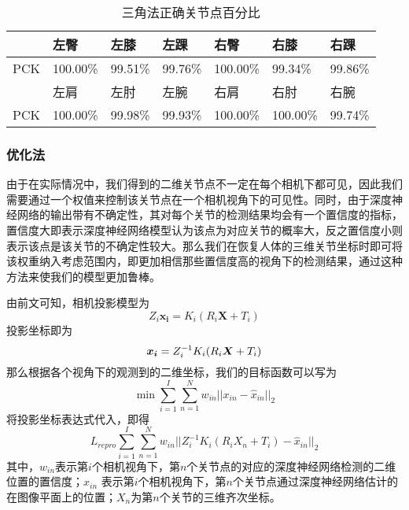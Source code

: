 \begin{table}[H]
    \centering
    \begin{tabular}{lllllll}
        \hline
            & 左臀     & 左膝    & 左踝    & 右臀     & 右膝     & 右踝    \\
        \hline
        PCK & 100.00\% & 99.51\% & 99.76\% & 100.00\% & 99.34\%  & 99.86\% \\
            & 左肩     & 左肘    & 左腕    & 右肩     & 右肘     & 右腕    \\
        PCK & 100.00\% & 99.98\% & 99.93\% & 100.00\% & 100.00\% & 99.74\% \\
        \hline
    \end{tabular}
    \caption{三角法正确关节点百分比\label{tab:3dpck}}
\end{table}


\subsubsection{优化法}
由于在实际情况中，我们得到的二维关节点不一定在每个相机下都可见，因此我们需要通过一个权值来控制该关节点在一个相机视角下的可见性。同时，由于深度神经网络的输出带有不确定性，其对每个关节的检测结果均会有一个置信度的指标，置信度大即表示深度神经网络模型认为该点为对应关节的概率大，反之置信度小则表示该点是该关节的不确定性较大。那么我们在恢复人体的三维关节坐标时即可将该权重纳入考虑范围内，即更加相信那些置信度高的视角下的检测结果，通过这种方法来使我们的模型更加鲁棒。

由前文可知，相机投影模型为
\begin{equation}
    Z_i \bm{x_i} = K_i(R_i\bm{X} + T_i)
\end{equation}
投影坐标即为
\begin{equation}
    \bm{x_i} = Z_i^{-1}K_i(R_i{\bm{X}} + T_i)
\end{equation}
那么根据各个视角下的观测到的二维坐标，我们的目标函数可以写为
\begin{equation}
    \min \sum^I_{i=1} \sum_{n=1}^N w_{in}||x_{in} - \hat x_{in}||_2
\end{equation}
将投影坐标表达式代入，即得
\begin{equation}
    L_{repro} \sum^I_{i=1} \sum_{n=1}^N w_{in}||Z_i^{-1}K_i(R_iX_n + T_i) - \hat x_{in}||_2
\end{equation}
\newcommand{\mi}{第\(i\)个}
\newcommand{\mn}{第\(n\)个}
其中，$w_{in}$表示\mi 相机视角下，\mn 关节点的对应的深度神经网络检测的二维位置的置信度；$\hat x_{in}$ 表示\mi 相机视角下，\mn 关节点通过深度神经网络估计的在图像平面上的位置；$X_n$为\mn 关节的三维齐次坐标。

